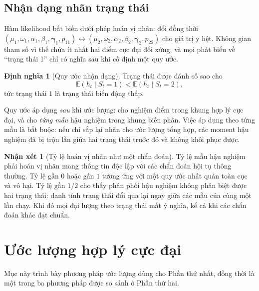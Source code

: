 \documentclass[12pt,a4paper]{article}
\numberwithin{equation}{section}
\theoremstyle{definition}
\newtheorem{definition}{Định nghĩa}[section]
\newtheorem{remark}{Nhận xét}[section]
\newcommand{\E}{\mathbb{E}}
\newcommand{\bmgamma}{\symbf{\gamma}}
\begin{document}
\subsection{Nhận dạng nhãn trạng thái}\label{subsec:label}
Hàm likelihood bất biến dưới phép hoán vị nhãn: đổi đồng thời
$(\mu_1,\omega_1,\alpha_1,\beta_1,\bmgamma_1,p_{11})\leftrightarrow
(\mu_2,\omega_2,\alpha_2,\beta_2,\bmgamma_2,p_{22})$ cho giá trị y hệt. Không gian tham
số vì thế chứa ít nhất hai điểm cực đại đối xứng, và mọi phát biểu về ``trạng thái 1''
chỉ có nghĩa sau khi cố định một quy ước.

\begin{definition}[Quy ước nhận dạng]\label{def:label}
Trạng thái được đánh số sao cho
\begin{equation}
  \E\!\left(h_t\mid S_t=1\right)<\E\!\left(h_t\mid S_t=2\right),
  \label{eq:label-identification}
\end{equation}
tức trạng thái $1$ là trạng thái biến động thấp.
\end{definition}

Quy ước áp dụng \emph{sau} khi ước lượng: cho nghiệm điểm trong khung hợp lý cực đại, và
cho \emph{từng mẫu} hậu nghiệm trong khung biến phân. Việc áp dụng theo từng mẫu là bắt
buộc: nếu chỉ sắp lại nhãn cho ước lượng tổng hợp, các moment hậu nghiệm đã bị trộn lẫn
giữa hai trạng thái trước đó và không khôi phục được.

\begin{remark}[Tỷ lệ hoán vị nhãn như một chẩn đoán]\label{rem:swap-rate}
Tỷ lệ mẫu hậu nghiệm phải hoán vị nhãn mang thông tin độc lập với các chẩn đoán hội tụ
thông thường. Tỷ lệ gần $0$ hoặc gần $1$ tương ứng với một quy ước nhất quán toàn cục và
vô hại. Tỷ lệ gần $1/2$ cho thấy phân phối hậu nghiệm không phân biệt được hai trạng
thái: danh tính trạng thái đổi qua lại ngay giữa các mẫu của cùng một lần chạy. Khi đó
mọi đại lượng theo trạng thái mất ý nghĩa, kể cả khi các chẩn đoán khác đạt chuẩn.
\end{remark}

\section{Ước lượng hợp lý cực đại}\label{sec:mle}

Mục này trình bày phương pháp ước lượng dùng cho Phần thứ nhất, đồng thời là một trong ba
phương pháp được so sánh ở Phần thứ hai.
\end{document}
